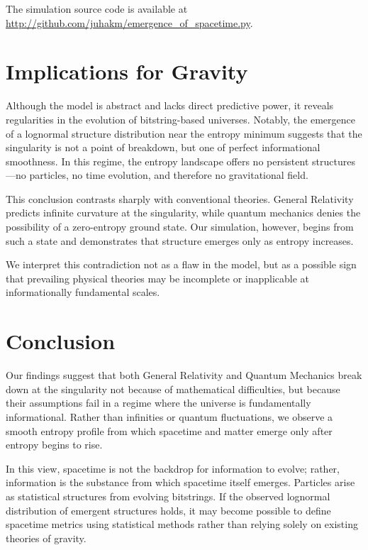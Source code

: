 \documentclass[11pt]{article}
\begin{document}
The simulation source code is available at \url{http://github.com/juhakm/emergence_of_spacetime.py}.

\section{Implications for Gravity}

Although the model is abstract and lacks direct predictive power, it reveals regularities in the evolution of bitstring-based universes. Notably, the emergence of a lognormal structure distribution near the entropy minimum suggests that the singularity is not a point of breakdown, but one of perfect informational smoothness. In this regime, the entropy landscape offers no persistent structures—no particles, no time evolution, and therefore no gravitational field.

This conclusion contrasts sharply with conventional theories. General Relativity predicts infinite curvature at the singularity, while quantum mechanics denies the possibility of a zero-entropy ground state. Our simulation, however, begins from such a state and demonstrates that structure emerges only as entropy increases.

We interpret this contradiction not as a flaw in the model, but as a possible sign that prevailing physical theories may be incomplete or inapplicable at informationally fundamental scales.

\section*{Conclusion}

Our findings suggest that both General Relativity and Quantum Mechanics break down at the singularity not because of mathematical difficulties, but because their assumptions fail in a regime where the universe is fundamentally informational. Rather than infinities or quantum fluctuations, we observe a smooth entropy profile from which spacetime and matter emerge only after entropy begins to rise.

In this view, spacetime is not the backdrop for information to evolve; rather, information is the substance from which spacetime itself emerges. Particles arise as statistical structures from evolving bitstrings. If the observed lognormal distribution of emergent structures holds, it may become possible to define spacetime metrics using statistical methods rather than relying solely on existing theories of gravity.
\end{document}
